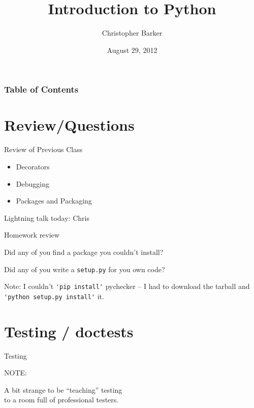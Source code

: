 \documentclass{beamer}
\title[Intro to Python: Week 9]{Introduction  to Python}
\author{Christopher Barker}
\institute{UW Continuing Education / Isilon}
\date{August 29, 2012}
\begin{document}
\begin{frame}
  \titlepage
\end{frame}

\begin{frame}
\frametitle{Table of Contents}
  \tableofcontents
\end{frame}


\section{Review/Questions}

\begin{frame}[fragile]{Review of Previous Class}

{\Large
\vfill
\begin{itemize}
  \item Decorators
  \item Debugging
  \item Packages and Packaging
\end{itemize}
}

\vfill
{\Large Lightning talk today: Chris}

\end{frame}


\begin{frame}[fragile]{Homework review}

\vfill
{\Large Did any of you find a package you couldn't install?}


\vfill
{\Large Did any of you write a \verb|setup.py| for you own code?}

\vfill

{\large Note: I couldn't \verb|'pip install'| pychecker -- I had to download
the tarball and \verb|'python setup.py install'| it.}

\end{frame}

\section{Testing / doctests}

\begin{frame}[fragile]{Testing}

{\huge NOTE:}

\vfill
{\LARGE A bit strange to be ``teaching'' testing \\[0.1in]
to a room full of professional testers.}

\vfill

\end{frame} 
\end{document}

